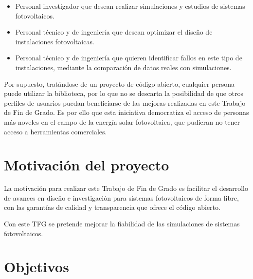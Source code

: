 \begin{itemize}

    \item Personal investigador que desean realizar simulaciones y estudios de sistemas fotovoltaicos.

    \item Personal técnico y de ingeniería que desean optimizar el diseño de instalaciones fotovoltaicas.

    \item Personal técnico y de ingeniería que quieren identificar fallos en este tipo de instalaciones, mediante la comparación de datos reales con simulaciones.

\end{itemize}

Por supuesto, tratándose de un proyecto de código abierto, cualquier persona puede utilizar la biblioteca, por lo que no se descarta la posibilidad de que otros perfiles de usuarios puedan beneficiarse de las mejoras realizadas en este Trabajo de Fin de Grado. Es por ello que esta iniciativa democratiza el acceso de personas más noveles en el campo de la energía solar fotovoltaica, que pudieran no tener acceso a herramientas comerciales.


\section{Motivación del proyecto} \label{sct:intro:motivacion}

La motivación para realizar este Trabajo de Fin de Grado es facilitar el desarrollo de avances en diseño e investigación para sistemas fotovoltaicos de forma libre, con las garantías de calidad y transparencia que ofrece el código abierto.

Con este TFG se pretende mejorar la fiabilidad de las simulaciones de sistemas fotovoltaicos.


\section{Objetivos} \label{sct:intro:objetivos}


